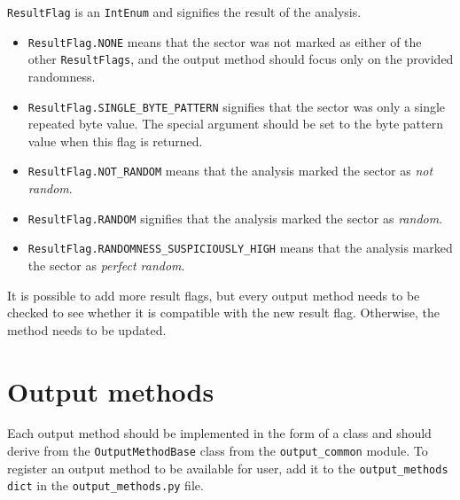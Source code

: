 \documentclass[
  digital, %
  color,   %
  oneside, %
  lof,     %
  nolot,     %
]{fithesis4}
\begin{document}
\texttt{ResultFlag} is an \texttt{IntEnum} and signifies the result of the analysis.
\begin{itemize}
  \item \texttt{ResultFlag.NONE} means that the sector was not marked as either of the other \texttt{ResultFlags}, and the output method should focus only on the provided randomness.
  \item \texttt{ResultFlag.SINGLE\_BYTE\_PATTERN} signifies that the sector was only a single repeated byte value.
    The special argument should be set to the byte pattern value when this flag is returned.
  \item \texttt{ResultFlag.NOT\_RANDOM} means that the analysis marked the sector as \emph{not random}.
  \item \texttt{ResultFlag.RANDOM} signifies that the analysis marked the sector as \emph{random}.
  \item \texttt{ResultFlag.RANDOMNESS\_SUSPICIOUSLY\_HIGH} means that the analysis marked the sector as \emph{perfect random}.
\end{itemize}
It is possible to add more result flags, but every output method needs to be checked to see whether it is compatible with the new result flag.
Otherwise, the method needs to be updated. 

\section{Output methods}
Each output method should be implemented in the form of a class and should derive from the \texttt{OutputMethodBase} class from the \texttt{output\_common} module.
To register an output method to be available for user, add it to the \texttt{output\_methods} \texttt{dict} in the \texttt{output\_methods.py} file.
\end{document}
